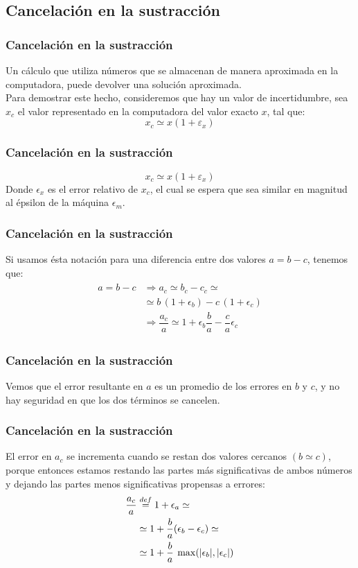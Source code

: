 \subsection{Cancelación en la sustracción}
\begin{frame}
\frametitle{Cancelación en la sustracción}
Un cálculo que utiliza números que se almacenan de manera aproximada en la computadora, puede devolver una solución aproximada.
\\
\bigskip
Para demostrar este hecho, consideremos que hay un valor de incertidumbre, sea $x_{c}$ el valor representado en la computadora del valor exacto $x$, tal que:
\begin{equation}
x_{c} \simeq  x( 1 + \varepsilon_{x})
\label{eq:ecuacion_02_05}
\end{equation}
\end{frame}
\begin{frame}
\frametitle{Cancelación en la sustracción}
\begin{equation*}
x_{c} \simeq  x( 1 + \varepsilon_{x})
\end{equation*}
Donde $\epsilon_{x}$ es el error relativo de $x_{c}$, el cual se espera que sea similar en magnitud al épsilon de la máquina $\epsilon_{m}$.
\end{frame}
\begin{frame}
\frametitle{Cancelación en la sustracción}
Si usamos ésta notación para una diferencia entre dos valores $a = b - c$, tenemos que:
\begin{align}
\begin{aligned}
a = b - c & \Rightarrow a_{c} \simeq b_{c} - c_{c} \simeq \\
 &\simeq b \, (1 + \epsilon_{b}) - c \, (1 + \epsilon_{c}) \\
{} & \Rightarrow \dfrac{a_{c}}{a} \simeq 1 + \epsilon_{b} \dfrac{b}{a} - \dfrac{c}{a} \epsilon_{c}
\end{aligned}
\label{eq:ecuacion:02_06}
\end{align} 
\end{frame}
\begin{frame}
\frametitle{Cancelación en la sustracción}
Vemos que el error resultante en $a$ es un promedio de los errores en $b$ y $c$, y no hay seguridad en que los dos términos se cancelen.
\end{frame}
\begin{frame}
\frametitle{Cancelación en la sustracción}
El error en $a_{c}$ se incrementa cuando se restan dos valores cercanos $(b \simeq c)$, porque entonces estamos restando las partes más significativas de ambos números y dejando las partes menos significativas propensas a errores:
\pause
\begin{align}
\begin{aligned}
\dfrac{a_{c}}{a} &\stackrel{def}{=} 1 + \epsilon_{a} \simeq  \\
&\simeq 1 + \dfrac{b}{a}(\epsilon_{b} - \epsilon_{c}) \simeq  \\
&\simeq 1 + \dfrac{b}{a} \: \max(\abs{\epsilon_{b}}, \abs{\epsilon_{c}})
\end{aligned}
\label{eq:ecuacion_02_07}
\end{align}
\end{frame}
